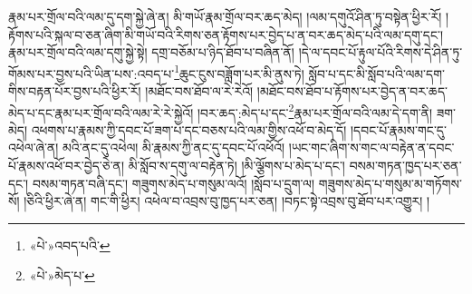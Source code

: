 རྣམ་པར་གྲོལ་བའི་ལམ་དུ་དག་སྐྱེ་ཞེ་ན། མི་གཡོ་རྣམ་གྲོལ་བར་ཆད་མེད། །ལམ་དགུའོ་ཤིན་ཏུ་བསྟེན་ཕྱིར་རོ། །རྟོགས་པའི་སྐལ་བ་ཅན་ཞིག་མི་གཡོ་བའི་རིགས་ཅན་རྟོགས་པར་བྱེད་པ་ན་བར་ཆད་མེད་པའི་ལམ་དགུ་དང་། རྣམ་པར་གྲོལ་བའི་ལམ་དགུ་སྐྱེ་སྟེ། དགྲ་བཅོམ་པ་ཉིད་ཐོབ་པ་བཞིན་ནོ། །དེ་ལ་དབང་པོ་རྟུལ་པོའི་རིགས་དེ་ཤིན་ཏུ་གོམས་པར་བྱས་པའི་ཡིན་པས་:འབད་པ་\footnote{«པེ་»འབད་པའི་}ཆུང་ངུས་བཟློག་པར་མི་ནུས་ཏེ། སློབ་པ་དང་མི་སློབ་པའི་ལམ་དག་གིས་བརྟན་པོར་བྱས་པའི་ཕྱིར་རོ། །མཐོང་བས་ཐོབ་ལ་རེ་རེའོ། །མཐོང་བས་ཐོབ་པ་རྟོགས་པར་བྱེད་ན་བར་ཆད་མེད་པ་དང་རྣམ་པར་གྲོལ་བའི་ལམ་རེ་རེ་སྐྱེའོ། །བར་ཆད་:མེད་པ་དང་\footnote{«པེ་»མེད་པ་}རྣམ་པར་གྲོལ་བའི་ལམ་དེ་དག་ནི། ཟག་མེད། འཕགས་པ་རྣམས་ཀྱི་དབང་པོ་ཟག་པ་དང་བཅས་པའི་ལམ་གྱིས་འཕོ་བ་མེད་དོ། །དབང་པོ་རྣམས་གང་དུ་འཕེལ་ཞེ་ན། མའི་ནང་དུ་འཕེལ། མི་རྣམས་ཀྱི་ནང་དུ་དབང་པོ་འཕོའོ། །ཡང་གང་ཞིག་ས་གང་ལ་བརྟེན་ན་དབང་པོ་རྣམས་འཕོ་བར་བྱེད་ཅེ་ན། མི་སློབ་ས་དགུ་ལ་བརྟེན་ཏེ། །མི་ལྕོགས་པ་མེད་པ་དང་། བསམ་གཏན་ཁྱད་པར་ཅན་དང་། བསམ་གཏན་བཞི་དང་། གཟུགས་མེད་པ་གསུམ་ལའོ། །སློབ་པ་དྲུག་ལ། གཟུགས་མེད་པ་གསུམ་མ་གཏོགས་སོ། །ཅིའི་ཕྱིར་ཞེ་ན། གང་གི་ཕྱིར། འཕེལ་བ་འབྲས་བུ་ཁྱད་པར་ཅན། །བཏང་སྟེ་འབྲས་བུ་ཐོབ་པར་འགྱུར། །
